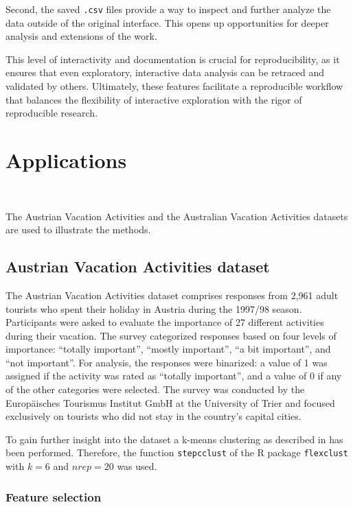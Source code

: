 \documentclass[article]{ajs}
\begin{document}
Second, the saved \texttt{.csv} files provide a way to inspect and further analyze the data outside of the original interface. This opens up opportunities for deeper analysis and extensions of the work.

This level of interactivity and documentation is crucial for reproducibility, as it ensures that even exploratory, interactive data analysis can be retraced and validated by others. Ultimately, these features facilitate a reproducible workflow that balances the flexibility of interactive exploration with the rigor of reproducible research.


\section{Applications}~\label{applications}

The Austrian Vacation Activities \cite{dolnicar2003winter} and the Australian Vacation Activities \cite{cliff2009formative} datasets are used to illustrate the methods.

\subsection{Austrian Vacation Activities dataset}

The Austrian Vacation Activities dataset comprises responses from 2,961 adult tourists who spent their holiday in Austria during the 1997/98 season. Participants were asked to evaluate the importance of 27 different activities during their vacation. The survey categorized responses based on four levels of importance: ``totally important'', ``mostly important'', ``a bit important'', and ``not important''. For analysis, the responses were binarized: a value of 1 was assigned if the activity was rated as ``totally important'', and a value of 0 if any of the other categories were selected. The survey was conducted by the Europäisches Tourismus Institut GmbH at the University of Trier and focused exclusively on tourists who did not stay in the country's capital cities.

To gain further insight into the dataset a k-means clustering as described in \cite{leisch2018market} has been performed. Therefore, the function \texttt{stepcclust} of the R package \texttt{flexclust}\citep{flexclust} with $k=6$ and $nrep=20$ was used.

\subsubsection{Feature selection}
\end{document}
